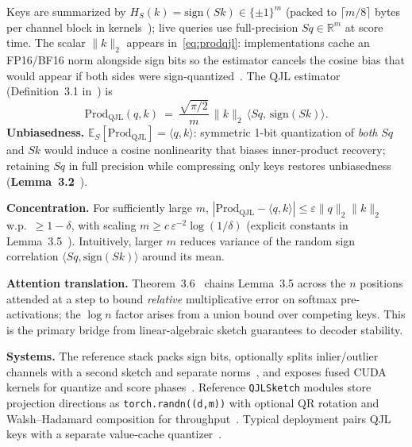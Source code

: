 \documentclass[conference]{IEEEtran}
\begin{document}
Keys are summarized by $H_S(k)=\mathrm{sign}(Sk)\in\{\pm1\}^m$ (packed to \(\lceil m/8\rceil\) bytes per channel block in kernels~\cite{qjlkernel}); live queries use full-precision $Sq\in\mathbb{R}^m$ at score time. The scalar $\|k\|_2$ appears in~\eqref{eq:prodqjl}: implementations cache an FP16/BF16 norm alongside sign bits so the estimator cancels the cosine bias that would appear if both sides were sign-quantized~\cite{zandieh2024qjl}.
The QJL estimator (Definition~3.1 in~\cite{zandieh2024qjl}) is
\begin{equation}
\mathrm{Prod}_{\mathrm{QJL}}(q,k) \ =\ \frac{\sqrt{\pi/2}}{m}\,\|k\|_2 \, \big\langle Sq,\, \mathrm{sign}(Sk) \big\rangle .
\label{eq:prodqjl}
\end{equation}
\textbf{Unbiasedness.} $\mathbb{E}_S[\mathrm{Prod}_{\mathrm{QJL}}]=\langle q,k\rangle$: symmetric 1-bit quantization of \emph{both} \(Sq\) and \(Sk\) would induce a cosine nonlinearity that biases inner-product recovery; retaining \(Sq\) in full precision while compressing only keys restores unbiasedness (\textbf{Lemma~3.2}~\cite{zandieh2024qjl}).

\textbf{Concentration.} For sufficiently large $m$, $|\mathrm{Prod}_{\mathrm{QJL}}-\langle q,k\rangle|\le \varepsilon \|q\|_2\|k\|_2$ w.p.\ $\ge 1-\delta$, with scaling $m\ge c\,\varepsilon^{-2}\log(1/\delta)$ (explicit constants in Lemma~3.5~\cite{zandieh2024qjl}). Intuitively, larger \(m\) reduces variance of the random sign correlation \(\langle Sq,\mathrm{sign}(Sk)\rangle\) around its mean.

\textbf{Attention translation.} Theorem~3.6~\cite{zandieh2024qjl} chains Lemma~3.5 across the \(n\) positions attended at a step to bound \emph{relative} multiplicative error on softmax pre-activations; the \(\log n\) factor arises from a union bound over competing keys. This is the primary bridge from linear-algebraic sketch guarantees to decoder stability.

\textbf{Systems.} The reference stack packs sign bits, optionally splits inlier/outlier channels with a second sketch and separate norms~\cite{zandieh2024qjl}, and exposes fused CUDA kernels for quantize and score phases~\cite{zandieh2024qjl,qjlkernel}. Reference \texttt{QJLSketch} modules store projection directions as \texttt{torch.randn((d,m))} with optional QR rotation and Walsh--Hadamard composition for throughput~\cite{qjlkernel,zandieh2024aqjl-repo}. Typical deployment pairs QJL keys with a separate value-cache quantizer~\cite{kivi2024}.
\end{document}
